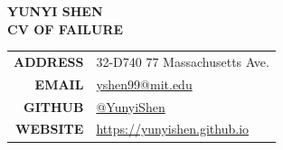 \documentclass[11pt,letterpaper]{article}
\begin{document}
\begin{center}
    {\LARGE \textbf{YUNYI SHEN}} \\[0.5em]
    {\textbf{CV OF FAILURE}} \\[1.5em]
    \begin{tabular}{rl}
        \textbf{ADDRESS} & 32-D740 77 Massachusetts Ave. \\
        \textbf{EMAIL} & \href{mailto:yshen99@mit.edu}{yshen99@mit.edu} \\
        \textbf{GITHUB} & \href{https://github.com/YunyiShen}{@YunyiShen} \\
        \textbf{WEBSITE} & \url{https://yunyishen.github.io}
    \end{tabular}
\end{center}

\vspace{1.5em}
\end{document}
